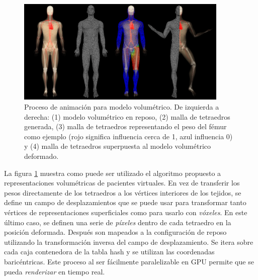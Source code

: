 \begin{figure}[!ht]%
   \centering
   \includegraphics[width=0.90\textwidth]{IMG/Volumetric}
    \caption{Proceso de animación para modelo volumétrico. De izquierda a derecha: (1) modelo volumétrico en reposo, (2) malla de tetraedros generada, (3) malla de tetraedros representando el peso del fémur como ejemplo (rojo significa influencia cerca de 1, azul influencia 0) y (4) malla de tetraedros superpuesta al modelo volumétrico deformado. }
    \label{fig:volEx}
\end{figure}
La figura \ref{fig:volEx} muestra como puede ser utilizado el algoritmo propuesto a representaciones volumétricas de pacientes virtuales. En vez de transferir los pesos directamente de los tetraedros a los vértices interiores de los tejidos, se define un campo de desplazamientos que se puede usar para transformar tanto vértices de representaciones superficiales como para usarlo con \emph{vóxeles}. En este último caso, se definen una serie de \emph{píxeles} dentro de cada tetraedro en la posición deformada. Después son mapeados a la configuración de reposo utilizando la transformación inversa del campo de desplazamiento. Se itera sobre cada caja contenedora de la \ac{tabla hash} y se utilizan las coordenadas baricéntricas. Este proceso al ser fácilmente paralelizable en \ac{GPU} permite que se pueda \emph{renderizar} en tiempo real.
%



